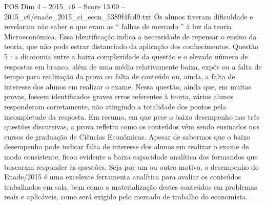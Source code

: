 \begin{textsample}{POS Dim 4 – 2015\_c6 – Score 13.00 – 2015\_c6/enade\_2015\_ci\_econ\_5389f4fcd9.txt}
Os alunos tiveram dificuldade e revelaram não saber o que eram as “ falhas de mercado ” à luz da teoria Microeconômica.
Essa identificação indica a necessidade de repensar o ensino da teoria, que não pode estrar distanciado da aplicação dos conhecimentos.
Questão 5 : a dicotomia entre a baixa complexidade da questão e o elevado número de respostas em branco, além de uma média relativamente baixa, expôs ou a falta de tempo para realização da prova ou falta de conteúdo ou, ainda, a falta de interesse dos alunos em realizar o exame.
Nessa questão, ainda que, em muitas provas, fossem identificados graves erros referentes à teoria, vários alunos responderam corretamente, não atingindo a totalidade dos pontos pela incompletude da resposta.
Em resumo, em que pese o baixo desempenho nas três questões discursivas, a prova refletiu como os conteúdos vêm sendo ensinados nos cursos de graduação de Ciências Econômicas.
Apesar de sabermos que o baixo desempenho pode indicar falta de interesse dos alunos em realizar o exame de modo consistente, ficou evidente a baixa capacidade analítica dos formandos que buscaram responder às questões.
Seja por um ou outro motivo, o desempenho do Enade/2015 é uma excelente ferramenta analítica para avaliar os conteúdos trabalhados em sala, bem como a materialização destes conteúdos em problemas reais e aplicáveis, como será exigido pelo mercado de trabalho do economista.

\end{textsample}
